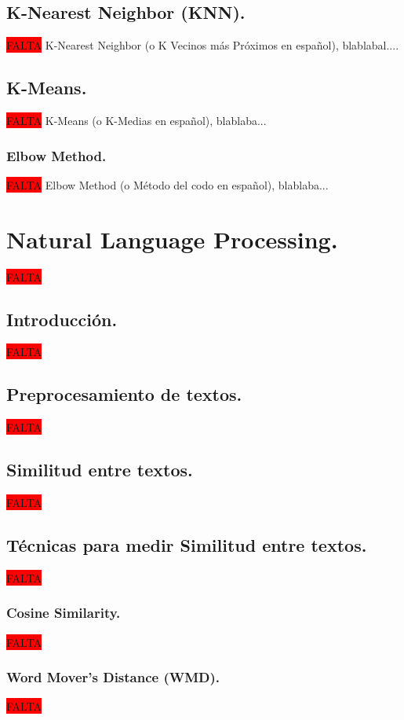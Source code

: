 \documentclass[12pt,a4paper]{article}
\begin{document}
\subsection{K-Nearest Neighbor (KNN).}
\colorbox{red}{FALTA}
K-Nearest Neighbor (o K Vecinos más Próximos en español), blablabal....

\subsection{K-Means.}
\colorbox{red}{FALTA}
K-Means (o K-Medias en español), blablaba...

\subsubsection{Elbow Method.}
\colorbox{red}{FALTA}
Elbow Method (o Método del codo en español), blablaba...

\section{Natural Language Processing.}
\colorbox{red}{FALTA}

\subsection{Introducción.}
\colorbox{red}{FALTA}

\subsection{Preprocesamiento de textos.}
\colorbox{red}{FALTA}

\subsection{Similitud entre textos.}
\colorbox{red}{FALTA}

\subsection{Técnicas para medir Similitud entre textos.}
\colorbox{red}{FALTA}

\subsubsection{Cosine Similarity.}
\colorbox{red}{FALTA}

\subsubsection{Word Mover's Distance (WMD).}
\colorbox{red}{FALTA}
\end{document}
